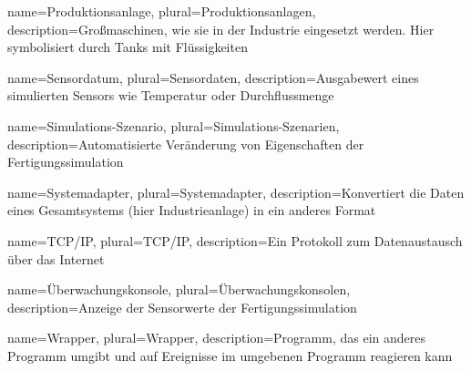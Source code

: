 {
  name=Produktionsanlage,
  plural=Produktionsanlagen,
  description={Großmaschinen, wie sie in der Industrie eingesetzt werden. Hier symbolisiert durch Tanks mit Flüssigkeiten}
}

{
  name=Sensordatum,
  plural=Sensordaten,
  description={Ausgabewert eines simulierten Sensors wie Temperatur oder Durchflussmenge}
}

{
  name=Simulations-Szenario,
  plural=Simulations-Szenarien,
  description={Automatisierte Veränderung von Eigenschaften der Fertigungssimulation}
}

{
  name=Systemadapter,
  plural=Systemadapter,
  description={Konvertiert die Daten eines Gesamtsystems (hier Industrieanlage) in ein anderes Format}
}

{
  name=TCP/IP,
  plural=TCP/IP,
  description={Ein Protokoll zum Datenaustausch über das Internet}
}

{
  name=Überwachungskonsole,
  plural=Überwachungskonsolen,
  description={Anzeige der Sensorwerte der Fertigungssimulation}
}

{
  name=Wrapper,
  plural=Wrapper,
  description={Programm, das ein anderes Programm umgibt und auf Ereignisse im umgebenen Programm reagieren kann}
}
